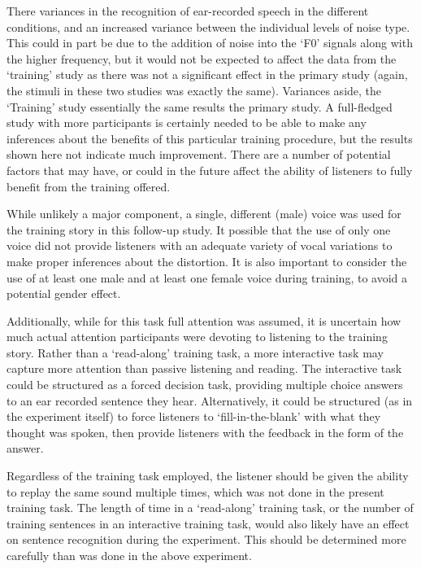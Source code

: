 There \DIFdelbegin {}\DIFdelend \DIFaddbegin {}\DIFaddend variances in the recognition of ear-recorded speech in the different conditions, and an increased variance between the individual levels of noise type.  This could in part be due to the addition of noise into the `F0' signals along with the higher frequency, but it would not be expected to affect the data from the `training' study as there was not a significant effect in the primary study (again, the stimuli in these two studies was exactly the same).  Variances aside, the `Training' study \DIFdelbegin {}\DIFdelend \DIFaddbegin {}\DIFaddend essentially the same results \DIFaddbegin {}\DIFaddend the primary study.  A full-fledged study with more participants is certainly needed to be able to make any inferences about the benefits of this particular training procedure, but the results shown here \DIFdelbegin {}\DIFdelend \DIFaddbegin {}\DIFaddend not indicate much improvement.  There are a number of potential factors that may have, or could in the future affect the ability of listeners to fully benefit from the training offered.  

While unlikely a major component, a single, different (male) voice was used for the training story in this follow-up study.  It \DIFdelbegin {}\DIFdelend \DIFaddbegin {}\DIFaddend possible that the use of only one voice did not provide listeners with an adequate variety of vocal variations to make proper inferences about the distortion.  It is also important to consider the use of at least one male and at least one female voice during training, to avoid a potential gender effect.

Additionally, while for this task full attention was assumed, it is uncertain how much actual attention participants were devoting to listening to the training story.  Rather than a `read-along' training task, a more interactive task may capture more attention than passive listening and reading.  The interactive task could be structured as a forced decision task, providing multiple choice answers to an ear recorded sentence they hear.  Alternatively, it could be structured (as in the experiment itself) to force listeners to `fill-in-the-blank' with what they thought was spoken, then provide listeners with the feedback in the form of the answer.  

Regardless of the training task employed, the listener should be given the ability to replay the same sound multiple times, which was not done in the present training task.  The length of time in a `read-along' training task, or the number of training sentences in an interactive training task, would also likely have an effect on sentence recognition during the experiment.  This should be determined more carefully than was done in the above experiment.

